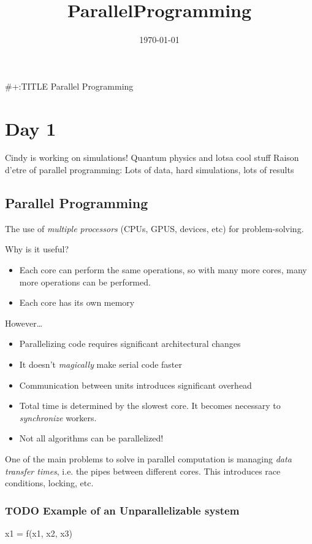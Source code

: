 \documentclass[11pt]{article}
\date{\today}
\title{ParallelProgramming}
\begin{document}
\maketitle
\tableofcontents

\#+:TITLE Parallel Programming

\section{Day 1}
\label{sec-1}
Cindy is working on simulations! Quantum physics and lotsa cool stuff
Raison d'etre of parallel programming: Lots of data, hard simulations, lots of results

\subsection{Parallel Programming}
\label{sec-1-1}
The use of \emph{multiple processors} (CPUs, GPUS, devices, etc) for problem-solving.

Why is it useful? 
\begin{itemize}
\item Each core can perform the same operations, so with many more cores, many more operations can be performed.
\item Each core has its own memory
\end{itemize}

However\ldots{}
\begin{itemize}
\item Parallelizing code requires significant architectural changes
\item It doesn't \emph{magically} make serial code faster
\item Communication between units introduces significant overhead
\item Total time is determined by the slowest core. It becomes necessary to \emph{synchronize} workers.
\item Not all algorithms can be parallelized!
\end{itemize}


One of the main problems to solve in parallel computation is managing \emph{data transfer times}, i.e. the pipes between different cores. This introduces race conditions, locking, etc.

\subsubsection{{\bfseries\sffamily TODO} Example of an Unparallelizable system}
\label{sec-1-1-1}
x1 = f(x1, x2, x3)
\end{document}
